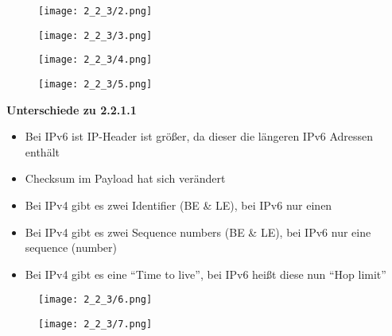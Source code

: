     \begin{figure}
        \texttt{[image: 2\_2\_3/2.png]}
    \end{figure}


    \begin{figure}
        \texttt{[image: 2\_2\_3/3.png]}
    \end{figure}

        \begin{figure}
            \texttt{[image: 2\_2\_3/4.png]}
        \end{figure}

        \begin{figure}
            \texttt{[image: 2\_2\_3/5.png]}
        \end{figure}

        \textbf{Unterschiede zu 2.2.1.1}
        \begin{itemize}
            \item Bei IPv6 ist IP-Header ist größer, da dieser die längeren IPv6 Adressen enthält
            \item Checksum im Payload hat sich verändert
            \item Bei IPv4 gibt es zwei Identifier (BE \& LE), bei IPv6 nur einen
            \item Bei IPv4 gibt es zwei Sequence numbers (BE \& LE), bei IPv6 nur eine sequence (number)
            \item Bei IPv4 gibt es eine “Time to live”, bei IPv6 heißt diese nun “Hop limit”
        \end{itemize}

        
        \begin{figure}
            \texttt{[image: 2\_2\_3/6.png]}
        \end{figure}

        \begin{figure}
            \texttt{[image: 2\_2\_3/7.png]}
        \end{figure}

